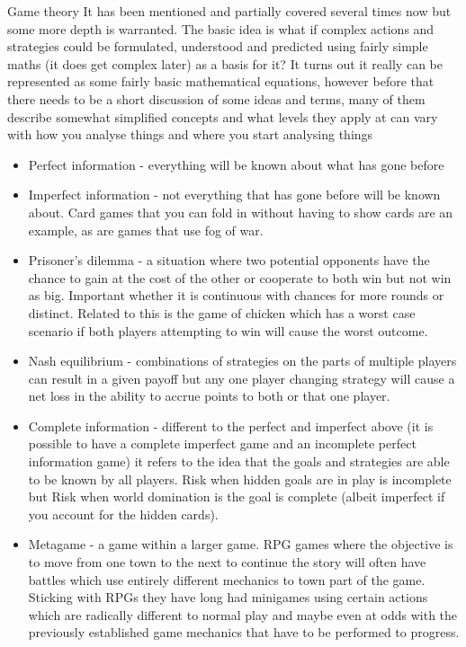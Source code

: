 \documentclass[
]{book}
\providecommand{\tightlist}{%
  \setlength{\itemsep}{0pt}\setlength{\parskip}{0pt}}
\begin{document}
Game theory It has been mentioned and partially covered several times now but some more depth is warranted. The basic idea is what if complex actions and strategies could be formulated, understood and predicted using fairly simple maths (it does get complex later) as a basis for it? It turns out it really can be represented as some fairly basic mathematical equations, however before that there needs to be a short discussion of some ideas and terms, many of them describe somewhat simplified concepts and what levels they apply at can vary with how you analyse things and where you start analysing things

\begin{itemize}
\tightlist
\item
  Perfect information - everything will be known about what has gone before
\item
  Imperfect information - not everything that has gone before will be known about. Card games that you can fold in without having to show cards are an example, as are games that use fog of war.
\item
  Prisoner's dilemma - a situation where two potential opponents have the chance to gain at the cost of the other or cooperate to both win but not win as big. Important whether it is continuous with chances for more rounds or distinct. Related to this is the game of chicken which has a worst case scenario if both players attempting to win will cause the worst outcome.
\item
  Nash equilibrium - combinations of strategies on the parts of multiple players can result in a given payoff but any one player changing strategy will cause a net loss in the ability to accrue points to both or that one player.
\item
  Complete information - different to the perfect and imperfect above (it is possible to have a complete imperfect game and an incomplete perfect information game) it refers to the idea that the goals and strategies are able to be known by all players. Risk when hidden goals are in play is incomplete but Risk when world domination is the goal is complete (albeit imperfect if you account for the hidden cards).
\item
  Metagame - a game within a larger game. RPG games where the objective is to move from one town to the next to continue the story will often have battles which use entirely different mechanics to town part of the game. Sticking with RPGs they have long had minigames using certain actions which are radically different to normal play and maybe even at odds with the previously established game mechanics that have to be performed to progress.

\end{itemize}
\end{document}
